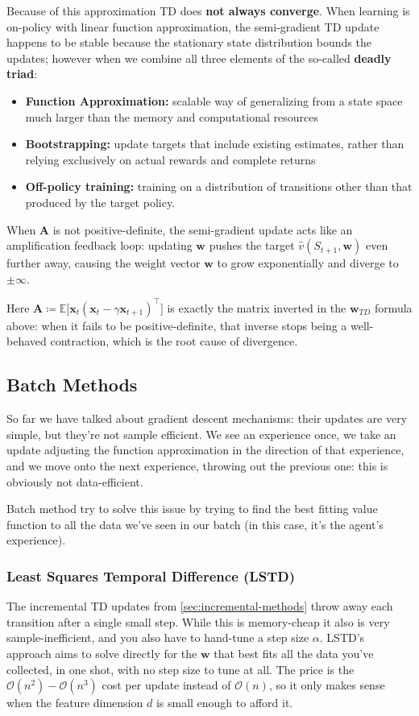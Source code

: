 Because of this approximation TD does \textbf{not always converge}. When learning is on-policy with linear function approximation, the semi-gradient TD update happens to be stable because the stationary state distribution bounds the updates; however when we combine all three elements of the so-called \textbf{deadly triad}:
\begin{itemize}
    \item \textbf{Function Approximation:} scalable way of generalizing from a state space
    much larger than the memory and computational resources
    \item \textbf{Bootstrapping:} update targets that include existing estimates,  rather than relying exclusively on actual rewards and
    complete returns
    \item \textbf{Off-policy training:} training on a distribution of transitions other than that produced
    by the target policy. 
\end{itemize}

When $\mathbf{A}$ is not positive-definite, the semi-gradient update acts like an amplification feedback loop: updating $\mathbf{w}$ pushes the target $\hat{v}(S_{t+1}, \mathbf{w})$ even further away, causing the weight vector $\mathbf{w}$ to grow exponentially and diverge to $\pm \infty$.

Here $\mathbf{A} \coloneqq \mathbb{E}\big[\mathbf{x}_t(\mathbf{x}_t - \gamma \mathbf{x}_{t+1})^\top\big]$ is exactly the matrix inverted in the $\mathbf{w}_{TD}$ formula above: when it fails to be positive-definite, that inverse stops being a well-behaved contraction, which is the root cause of divergence.


\subsection{Batch Methods}
So far we have talked about gradient descent mechanisms: their updates are very simple, but they're not sample efficient. We see an experience once, we take an update adjusting the function approximation in the direction of that experience, and we move onto the next experience, throwing out the previous one: this is obviously not data-efficient. 

Batch method try to solve this issue by trying to find the best fitting value function to all the data we've seen in our batch (in this case, it's the agent's experience).

\subsubsection{Least Squares Temporal Difference (LSTD)}
The incremental TD updates from \ref{sec:incremental-methods} throw away each transition after a single small step. While this is memory-cheap it also is very sample-inefficient, and you also have to hand-tune a step size $\alpha$. LSTD's approach aims to solve directly for the $\mathbf{w}$ that best fits all the data you've collected, in one shot, with no step size to tune at all. The price is the $\mathcal{O}(n^2) - \mathcal{O}(n^3)$ cost per update instead of $\mathcal{O}(n)$, so it only makes sense when the feature dimension $d$ is small enough to afford it.

